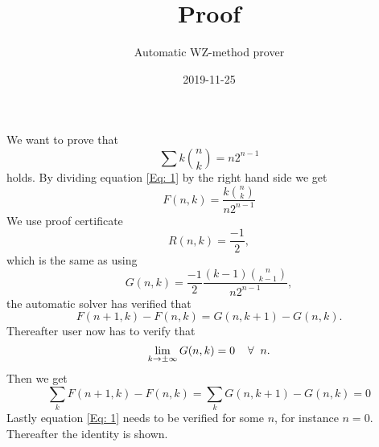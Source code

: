 \documentclass{article}
\title{Proof}
\author{Automatic WZ-method prover}
\date{2019-11-25}
\let\oldforall\forall
\renewcommand{\forall}{\hspace*{2mm}\oldforall\hspace*{1mm}}
\begin{document}
\maketitle
We want to prove that
\begin{equation}\label{Eq: 1}
\sum k\binom{n}{k} = n2^{n-1}
\end{equation}
holds. By dividing equation \ref{Eq: 1} by the right hand side we get
\begin{equation}
F(n,k)=\frac{k\binom{n}{k}}{n2^{n-1}}
\end{equation}
We use proof certificate
\begin{equation}
R(n,k)=\frac{-1}{2},
\end{equation}
which is the same as using
\begin{equation}
G(n,k)=\frac{-1}{2}\frac{(k-1)\binom{n}{k-1}}{n2^{n-1}},
\end{equation}
the automatic solver has  verified that
\begin{equation}\label{Eq: WZ1}
F(n+1,k)-F(n,k)=G(n,k+1)-G(n,k).
\end{equation}
Thereafter user now has to verify that
\begin{equation}
\lim_{k\to\pm\infty}G(n,k)=0\forall n.
\end{equation}
Then we get
\begin{equation}
\sum_k F(n+1,k)-F(n,k)=\sum_k G(n,k+1)-G(n,k)=0\end{equation}Lastly equation \ref{Eq: 1} needs to be verified for some $n$, for instance $n=0$. Thereafter the identity is shown.
\end{document}
